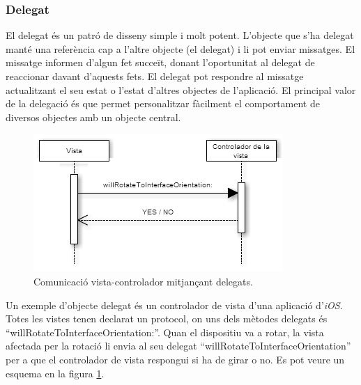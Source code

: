 
\subsubsection{Delegat}
\label{sec:patro_delegat}

El delegat és un patró de disseny simple i molt potent. L'objecte que s'ha delegat manté una referència cap a l'altre objecte (el delegat) i li pot enviar missatges.
El missatge informen d'algun fet succeït, donant l'oportunitat al delegat de reaccionar davant d'aquests fets. El delegat pot respondre al missatge actualitzant el seu estat o l'estat d'altres objectes de l'aplicació. El principal valor de la delegació és que permet personalitzar fàcilment el comportament de diversos objectes amb un objecte central.

\begin{figure}[ht]
    \centering
    \includegraphics[scale=1]{Memoria/Arquitectura/iOS/patro_delegat.png}
    \caption{Comunicació vista-controlador mitjançant delegats.}
    \label{fig:patro_delegat}
\end{figure}


Un exemple d'objecte delegat és un controlador de vista d'una aplicació d'\textit{iOS}. Totes les vistes tenen declarat un protocol, on uns dels mètodes delegats és ``willRotateToInterfaceOrientation:''. Quan el dispositiu va a rotar, la vista afectada per la rotació li envia al seu delegat ``willRotateToInterfaceOrientation'' per a que el controlador de vista respongui si ha de girar o no. Es pot veure un esquema en la figura \ref{fig:patro_delegat}.